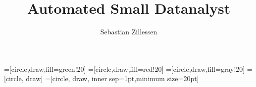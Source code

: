 \documentclass[isdraft]{kclthesis}  %
\title{Automated Small Datanalyst}
\author{Sebastian Zillessen}
\begin{document}


\maketitle 		%
\maketitleTwo 	%

\newpage
\thispagestyle{empty}
\mbox{}
\newpage


\setcounter{tocdepth}{4}
\tableofcontents
\newpage


\fancyhead{}
\fancyfoot{}
\pagestyle{fancy} 
\fancyhead[RO,LE]{\sffamily\small \thepage}
\fancyhead[LO,RE]{\sffamily\small \nouppercase{\rightmark}}
\renewcommand{\headrulewidth}{0.4pt}
\renewcommand{\footrulewidth}{0.0pt}

\newcommand{\R}{\mathcal{R}}
\renewcommand{\S}{\mathcal{S}}
\renewcommand{\D}{\mathcal{D}}

\newcommand{\low}[1]{{\tiny $_{#1}$}}
\newcommand{\tbd}[1]{\todo{TBD}{\color{gray} #1}}

=[circle,draw,fill=green!20]
=[circle,draw,fill=red!20]
=[circle,draw,fill=gray!20]
=[circle, draw]
=[circle, draw, inner sep=1pt,minimum size=20pt]








%
%



%


 


\appendix



\end{document}

